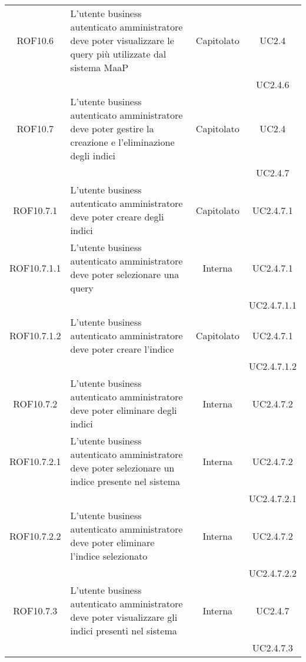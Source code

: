 \begin{longtable}{|c|p{6cm}|c|c|}
\midrule
ROF10.6
& L'utente business autenticato amministratore deve poter visualizzare le query più utilizzate dal sistema MaaP
& Capitolato
& UC2.4\\
& & & UC2.4.6
\\

\midrule
ROF10.7
& L'utente business autenticato amministratore deve poter gestire la creazione e l'eliminazione degli indici
& Capitolato
& UC2.4\\
& & & UC2.4.7
\\

\midrule
ROF10.7.1
& L'utente business autenticato amministratore deve poter creare degli indici
& Capitolato
& UC2.4.7.1\\

\midrule
ROF10.7.1.1
& L'utente business autenticato amministratore deve poter selezionare una query
& Interna
& UC2.4.7.1\\
& & & UC2.4.7.1.1
\\

\midrule
ROF10.7.1.2
& L'utente business autenticato amministratore deve poter creare l'indice
& Capitolato
& UC2.4.7.1\\
& & & UC2.4.7.1.2
\\


\midrule
ROF10.7.2
& L'utente business autenticato amministratore deve poter eliminare degli indici
& Interna
& UC2.4.7.2\\

\midrule
ROF10.7.2.1
& L'utente business autenticato amministratore deve poter selezionare un indice presente nel sistema
& Interna
& UC2.4.7.2\\
& & & UC2.4.7.2.1
\\

\midrule
ROF10.7.2.2
& L'utente business autenticato amministratore deve poter eliminare l'indice selezionato
& Interna
& UC2.4.7.2\\
& & & UC2.4.7.2.2
\\

\midrule
ROF10.7.3
& L'utente business autenticato amministratore deve poter visualizzare gli indici presenti nel sistema
& Interna
& UC2.4.7\\
& & & UC2.4.7.3
\\


\end{longtable}

\newpage
